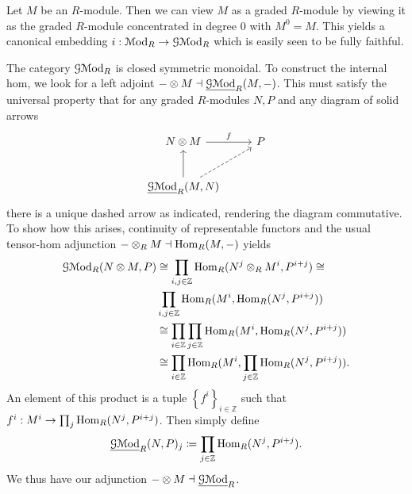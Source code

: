 \begin{remark}\label{1.1.10}
	Let $M$ be an $R$-module. Then we can view $M$ as a graded $R$-module by viewing it as the graded $R$-module concentrated in degree $0$ with $M^0=M$. This yields a canonical embedding $i : \mathcal{M}\mathrm{od} _R \to \mathcal{G} \mathcal{M}\mathrm{od} _R$ which is easily seen to be fully faithful.
\end{remark}

\begin{remark}\label{1.1.11}
	The category $\mathcal{G} \mathcal{M}\mathrm{od} _R$ is closed symmetric monoidal. To construct the internal hom, we look for a left adjoint $-\otimes M \dashv \underline{\mathcal{G} \mathcal{M}\mathrm{od} }_R (M,-)$. This must satisfy the universal property that for any graded $R$-modules $N,P$ and any diagram of solid arrows
	\[\begin{tikzcd}[row sep = 2.5em, column sep = 2.5em]
	N\otimes M \ar[" f ", r]  & P \\
	\underline{\mathcal{G} \Mod}_R (M,N)\ar[u] \ar[dashed, ur]  & 
	\end{tikzcd}\]
	there is a unique dashed arrow as indicated, rendering the diagram commutative. To show how this arises, continuity of representable functors and the usual tensor-hom adjunction $-\otimes _RM \dashv \operatorname{Hom}_R(M, -) $ yields
	\begin{align*}
		\mathcal{G} \mathcal{M}\mathrm{od} _R(N\otimes M,P) &\cong \prod_{i,j\in\mathbb{Z} } \operatorname{Hom}_R(N^j\otimes _RM^i, P^{i+j} ) \cong\\
						  &\prod_{i,j\in\mathbb{Z} } \operatorname{Hom}_R(M^i, \operatorname{Hom}_R(N^j, P^{i+j} ) ) \\
						  &\cong \prod_{i\in\mathbb{Z} } \prod_{j\in\mathbb{Z} } \operatorname{Hom}_R(M^i, \operatorname{Hom}_R(N^j, P^{i+j} ) ) \\
						  &\cong \prod_{i\in\mathbb{Z} } \operatorname{Hom}_R(M^i, \prod_{j\in\mathbb{Z} } \operatorname{Hom}_R(N^j, P^{i+j} ) )
	.\end{align*}
	An element of this product is a tuple $\left\{ f^i \right\}_{i\in\mathbb{Z} } $ such that $f^i : M^i \to \prod_{j} \operatorname{Hom}_R(N^j, P^{i+j} ) $. Then simply define
	\[
		\underline{\mathcal{G} \mathcal{M}\mathrm{od}}_R(N,P)_j \coloneqq \prod_{j\in\mathbb{Z} } \operatorname{Hom}_R(N^j, P^{i+j} ) 
	.\]
	We thus have our adjunction $-\otimes M \dashv \underline{\mathcal{G} \mathcal{M}\mathrm{od}}_R$.
\end{remark}

